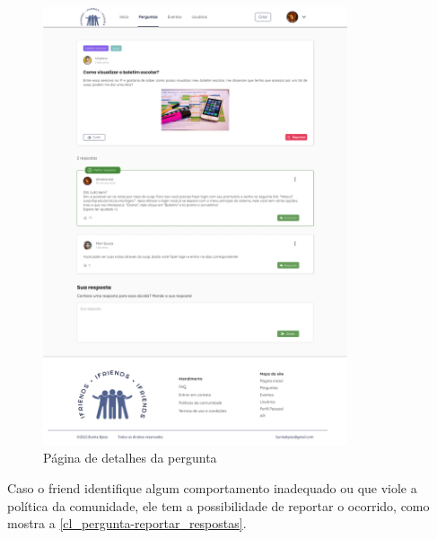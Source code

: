 \begin{figure}[htb]
\centering
\caption{\label{cl_detalhes_pergunta} Página de detalhes da pergunta}
\includegraphics[width=0.8\textwidth]{anexos/Imagens_Prototipo/com_login/detalhes_perguntas.png}
\end{figure}
\FloatBarrier

Caso o \gls{friend} identifique algum comportamento inadequado ou que viole a política da comunidade, ele tem a possibilidade de reportar o ocorrido, como mostra a \autoref{cl_pergunta-reportar_respostas}.

